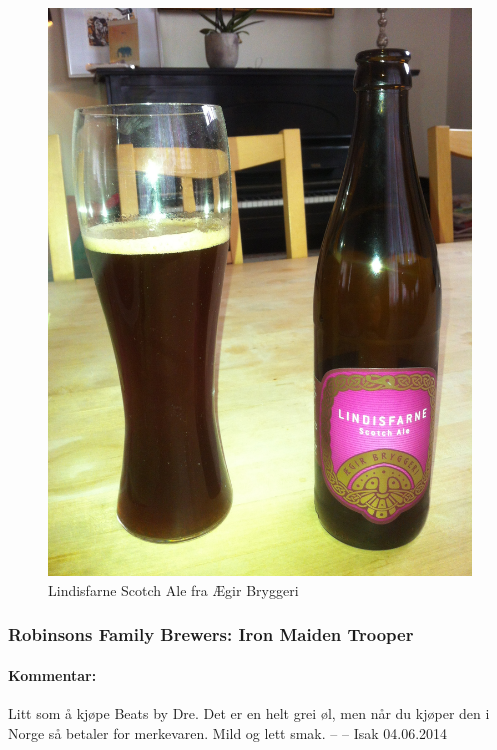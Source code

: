 \documentclass[12pt,a4paper,oneside,norsk]{article}
\begin{document}
\begin{figure} [H]
\centering
\includegraphics[scale=0.1, angle=270]{Bilder/Ol/lindisfarne}
\caption{Lindisfarne Scotch Ale fra Ægir Bryggeri}
\end{figure}

\newpage
\subsubsection{Robinsons Family Brewers: Iron Maiden Trooper}
\paragraph{Kommentar:}Litt som å kjøpe Beats by Dre. Det er en helt grei øl, men når du kjøper den i Norge så betaler for merkevaren. Mild og lett smak. 
\newline
-- -- Isak 04.06.2014
\end{document}
